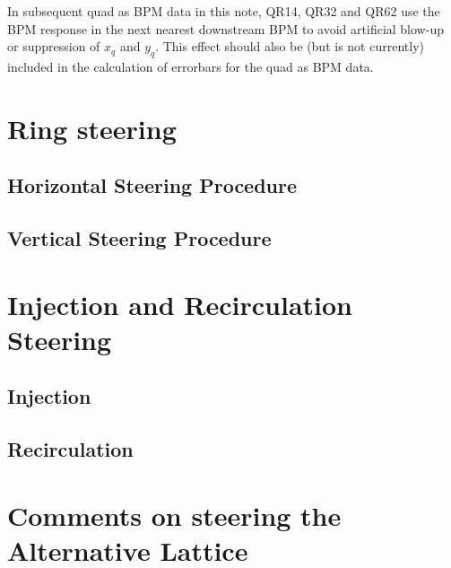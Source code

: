 

In subsequent quad as BPM data in this note, QR14, QR32 and QR62 use the BPM response in the next nearest downstream BPM to avoid artificial blow-up or suppression of $x_q$ and $y_q$. 
This effect should also be (but is not currently) included in the calculation of errorbars for the quad as BPM data.












\section{Ring steering}




\subsection{Horizontal Steering Procedure}
\subsection{Vertical Steering Procedure}

\section{Injection and Recirculation Steering}
\subsection{Injection}
\subsection{Recirculation}

\section{Comments on steering the Alternative Lattice}



